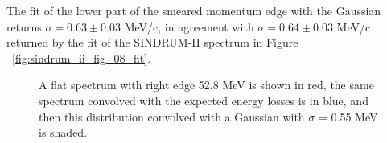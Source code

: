The fit of the lower part of the smeared momentum edge with the Gaussian returns
$\sigma = 0.63 \pm 0.03$ MeV/c, in agreement with $\sigma = 0.64 \pm 0.03$ MeV/c
returned by the fit of the SINDRUM-II spectrum in Figure ~\ref{fig:sindrum_ii_fig_08_fit}.

\begin{figure} 
\caption{
  \label{fig:sindrum_ii_michel_calibration}
  A flat spectrum with right edge 52.8 MeV is shown in red, the same spectrum convolved with 
  the expected energy losses is in blue, and then this distribution convolved with
  a Gaussian with $\sigma$ = 0.55 MeV is shaded.
}
\end{figure}


